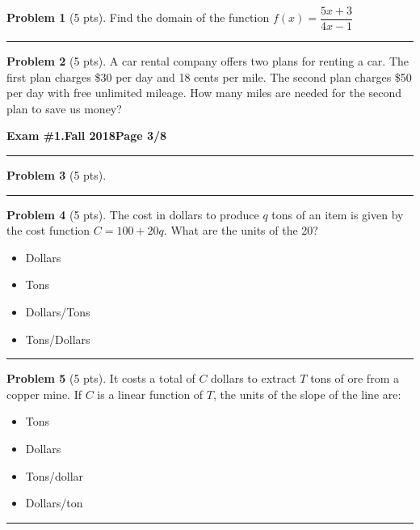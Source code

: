 \documentclass[12pt]{article}
\makeatletter
\theoremstyle{definition}
\newtheorem{problem}{Problem}
\newcommand*{\radiobutton}{%
  \@ifstar{\@radiobutton0}{\@radiobutton1}%
}
\newcommand*{\@radiobutton}[1]{%
  \begin{tikzpicture}
    \pgfmathsetlengthmacro\radius{height("X")/2}
    \draw[radius=\radius] circle;
    \ifcase#1 \fill[radius=.6*\radius] circle;\fi
  \end{tikzpicture}%
}
\makeatother
\begin{document}
\begin{problem}[5 pts]
  Find the domain of the function $f(x) = \dfrac{5x+3}{4x-1}$

  \vspace{3cm}
\end{problem}
\hrule

\begin{problem}[5 pts]
  A car rental company offers two plans for renting a car.  The first plan charges \$30 per day and 18 cents per
  mile.  The second plan charges \$50 per day with free unlimited mileage.  How many miles are needed for the second
  plan to save us money?
\end{problem}

\newpage

\hfill{\large\bf Exam \#1.}\hfill{\large\bf  Fall 2018}\hfill{\large\bf Page 3/8}\hrule

\bigskip
\begin{problem}[5 pts]
  
\end{problem}
\hrule

\begin{problem}[5 pts]
  The cost in dollars to produce $q$ tons of an item is given by the cost function $C = 100 + 20q$. What are the units of
  the 20? 
  \begin{itemize}
  \item[\radiobutton] Dollars
  \item[\radiobutton] Tons
  \item[\radiobutton] Dollars/Tons
  \item[\radiobutton] Tons/Dollars
  \end{itemize} 
\end{problem}
\hrule

\begin{problem}[5 pts]
  It costs a total of $C$ dollars to extract $T$ tons of ore from a copper mine. If $C$ is a linear function of $T$, the
  units of the slope of the line are: 
  \begin{itemize}
  \item[\radiobutton] Tons
  \item[\radiobutton] Dollars
  \item[\radiobutton] Tons/dollar
  \item[\radiobutton] Dollars/ton
  \end{itemize}
\end{problem}
\hrule
\end{document}
